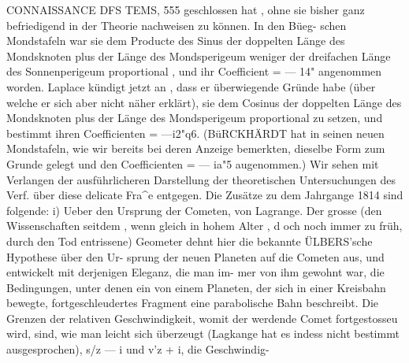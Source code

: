 \documentclass[12pt,a4paper]{article}
\begin{document}
\newpage
CONNAISSANCE DFS TEMS, 555\newline
geschlossen hat , ohne sie bisher ganz befriedigend in der Theorie nachweisen zu können. In den Büeg-\newline
schen Mondstafeln war sie dem Producte des Sinus der doppelten Länge des Mondsknoten plus der Länge\newline
des Mondsperigeum weniger der dreifachen Länge des Sonnenperigeum proportional , und ihr Coefficient\newline
= --- 14" angenommen worden. Laplace kündigt jetzt an , dass er überwiegende Gründe habe (über\newline
welche er sich aber nicht näher erklärt), sie dem Cosinus der doppelten Länge des Mondsknoten plus\newline
der Länge des Mondsperigeum proportional zu setzen, und bestimmt ihren Coefficienten = ---i2"q6.\newline
(BüRCKHÄRDT hat in seinen neuen Mondstafeln, wie wir bereits bei deren Anzeige bemerkten, dieselbe\newline
Form zum Grunde gelegt und den Coefficienten = --- ia"5 augenommen.) Wir sehen mit Verlangen\newline
der ausführlicheren Darstellung der theoretischen Untersuchungen des Verf. über diese delicate Fra\^{}e\newline
entgegen.\newline
Die Zusätze zu dem Jahrgange 1814 sind folgende: i) Ueber den Ursprung der Cometen, von\newline
Lagrange. Der grosse (den Wissenschaften seitdem , wenn gleich in hohem Alter , d och noch immer zu\newline
früh, durch den Tod entrissene) Geometer dehnt hier die bekannte ÜLBERS'sche Hypothese über den Ur-\newline
sprung der neuen Planeten auf die Cometen aus, und entwickelt mit derjenigen Eleganz, die man im-\newline
mer von ihm gewohnt war, die Bedingungen, unter denen ein von einem Planeten, der sich in einer\newline
Kreisbahn bewegte, fortgeschleudertes Fragment eine parabolische Bahn beschreibt. Die Grenzen der\newline
relativen Geschwindigkeit, womit der werdende Comet fortgestosseu wird, sind, wie man leicht sich\newline
überzeugt (Lagkange hat es indess nicht bestimmt ausgesprochen), s/z --- i und v'z + i, die Geschwindig-\newline
\end{document}
